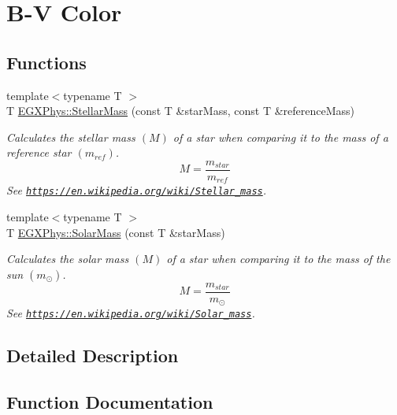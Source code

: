 \hypertarget{group___b_v_color}{}\section{B-\/V Color}
\label{group___b_v_color}
\subsection*{Functions}
\begin{DoxyCompactItemize}
\item 
{\footnotesize template$<$typename T $>$ }\\T \mbox{\hyperlink{group___b_v_color_gabbd6081cd3bfb0153d7470d58f733a61}{E\+G\+X\+Phys\+::\+Stellar\+Mass}} (const T \&star\+Mass, const T \&reference\+Mass)
\begin{DoxyCompactList}\small\item\em Calculates the stellar mass $(M)$ of a star when comparing it to the mass of a reference star $(m_{ref})$. \[M=\frac{m_{star}}{m_{ref}}\] See \href{https://en.wikipedia.org/wiki/Stellar_mass}{\tt https\+://en.\+wikipedia.\+org/wiki/\+Stellar\+\_\+mass}. \end{DoxyCompactList}\item 
{\footnotesize template$<$typename T $>$ }\\T \mbox{\hyperlink{group___b_v_color_gac393d64d586be3dc76ac7a98ac336514}{E\+G\+X\+Phys\+::\+Solar\+Mass}} (const T \&star\+Mass)
\begin{DoxyCompactList}\small\item\em Calculates the solar mass $(M)$ of a star when comparing it to the mass of the sun $(m_\odot)$. \[M=\frac{m_{star}}{m_\odot}\] See \href{https://en.wikipedia.org/wiki/Solar_mass}{\tt https\+://en.\+wikipedia.\+org/wiki/\+Solar\+\_\+mass}. \end{DoxyCompactList}\end{DoxyCompactItemize}


\subsection{Detailed Description}


\subsection{Function Documentation}
\mbox{\label{group___b_v_color_gac393d64d586be3dc76ac7a98ac336514}} 
